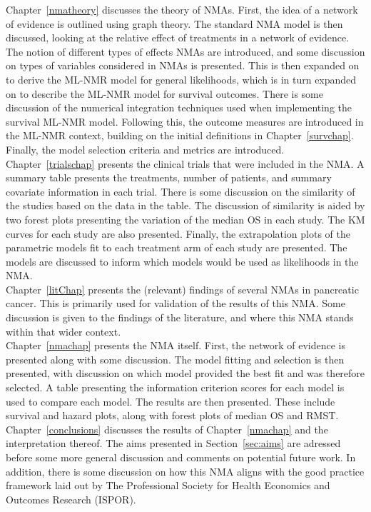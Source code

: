 Chapter~\ref{nmatheory} discusses the theory of NMAs. First, the idea of a network of evidence is outlined using graph theory. The standard NMA model is then discussed, looking at the relative effect of treatments in a network of evidence. The notion of different types of effects NMAs are introduced, and some discussion on types of variables considered in NMAs is presented. This is then expanded on to derive the ML-NMR model for general likelihoods, which is in turn expanded on to describe the ML-NMR model for survival outcomes. There is some discussion of the numerical integration techniques used when implementing the survival ML-NMR model. Following this, the outcome measures are introduced in the ML-NMR context, building on the initial definitions in Chapter~\ref{survchap}. Finally, the model selection criteria and metrics are introduced. \\

Chapter~\ref{trialschap} presents the clinical trials that were included in the NMA. A summary table presents the treatments, number of patients, and summary covariate information in each trial. There is some discussion on the similarity of the studies based on the data in the table. The discussion of similarity is aided by two forest plots presenting the variation of the median OS in each study. The KM curves for each study are also presented. Finally, the extrapolation plots of the parametric models fit to each treatment arm of each study are presented. The models are discussed to inform which models would be used as likelihoods in the NMA. \\

Chapter~\ref{litChap} presents the (relevant) findings of several NMAs in pancreatic cancer. This is primarily used for validation of the results of this NMA. Some discussion is given to the findings of the literature, and where this NMA stands within that wider context. \\

Chapter~\ref{nmachap} presents the NMA itself. First, the network of evidence is presented along with some discussion. The model fitting and selection is then presented, with discussion on which model provided the best fit and was therefore selected. A table presenting the information criterion scores for each model is used to compare each model. The results are then presented. These include survival and hazard plots, along with forest plots of median OS and RMST. \\

Chapter~\ref{conclusions} discusses the results of Chapter~\ref{nmachap} and the interpretation thereof. The aims presented in Section~\ref{sec:aims} are adressed before some more general discussion and comments on potential future work. In addition, there is some discussion on how this NMA aligns with the good practice framework laid out by The Professional Society for Health Economics and Outcomes Research (ISPOR).\\

